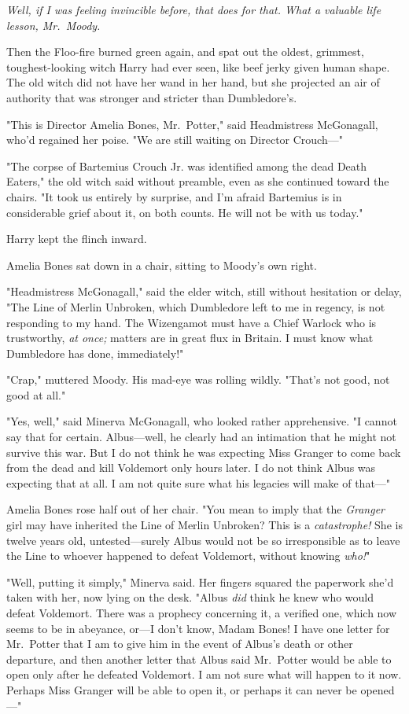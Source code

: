 \emph{Well, if I was feeling invincible before, that does for that. What a
valuable life lesson, Mr.~Moody.}

Then the Floo-fire burned green again, and spat out the oldest, grimmest,
toughest-looking witch Harry had ever seen, like beef jerky given human shape.
The old witch did not have her wand in her hand, but she projected an air of
authority that was stronger and stricter than Dumbledore's.

"This is Director Amelia Bones, Mr.~Potter," said Headmistress McGonagall,
who'd regained her poise. "We are still waiting on Director Crouch---"

"The corpse of Bartemius Crouch Jr. was identified among the dead Death
Eaters," the old witch said without preamble, even as she continued toward the
chairs. "It took us entirely by surprise, and I'm afraid Bartemius is in
considerable grief about it, on both counts. He will not be with us today."

Harry kept the flinch inward.

Amelia Bones sat down in a chair, sitting to Moody's own right.

"Headmistress McGonagall," said the elder witch, still without hesitation or
delay, "The Line of Merlin Unbroken, which Dumbledore left to me in regency, is
not responding to my hand. The Wizengamot must have a Chief Warlock who is
trustworthy, \emph{at once;} matters are in great flux in Britain. I must know
what Dumbledore has done, immediately!"

"Crap," muttered Moody. His mad-eye was rolling wildly. "That's not good, not
good at all."

"Yes, well," said Minerva McGonagall, who looked rather apprehensive. "I cannot
say that for certain. Albus---well, he clearly had an intimation that he might
not survive this war. But I do not think he was expecting Miss Granger to come
back from the dead and kill Voldemort only hours later. I do not think Albus
was expecting that at all. I am not quite sure what his legacies will make of
that---"

Amelia Bones rose half out of her chair. "You mean to imply that the
\emph{Granger} girl may have inherited the Line of Merlin Unbroken? This is a
\emph{catastrophe!} She is twelve years old, untested---surely Albus would not
be so irresponsible as to leave the Line to whoever happened to defeat
Voldemort, without knowing \emph{who!}"

"Well, putting it simply," Minerva said. Her fingers squared the paperwork
she'd taken with her, now lying on the desk. "Albus \emph{did} think he knew
who would defeat Voldemort. There was a prophecy concerning it, a verified one,
which now seems to be in abeyance, or---I don't know, Madam Bones! I have one
letter for Mr.~Potter that I am to give him in the event of Albus's death or
other departure, and then another letter that Albus said Mr.~Potter would be
able to open only after he defeated Voldemort. I am not sure what will happen
to it now. Perhaps Miss Granger will be able to open it, or perhaps it can
never be opened---"


